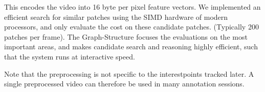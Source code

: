 \documentclass[portrait,final,a0paper,fontscale=0.277]{baposter}
\begin{document}
\begin{poster}
{  This encodes the video into 16 byte per pixel feature vectors. We implemented
  an efficient search for similar patches using the SIMD hardware of modern
  processors, and only evaluate the cost on these candidate patches. (Typically
  200 patches per frame). The Graph-Structure focuses the evaluations on the most
  important areas, and makes candidate search and reasoning highly efficient,
  such that the system runs at interactive speed.

  Note that the preprocessing is not specific to the interestpoints tracked
  later. A single preprocessed video can therefore be used in many annotation
  sessions.
  \vspace{5em}
}


\end{poster}
\end{document}
